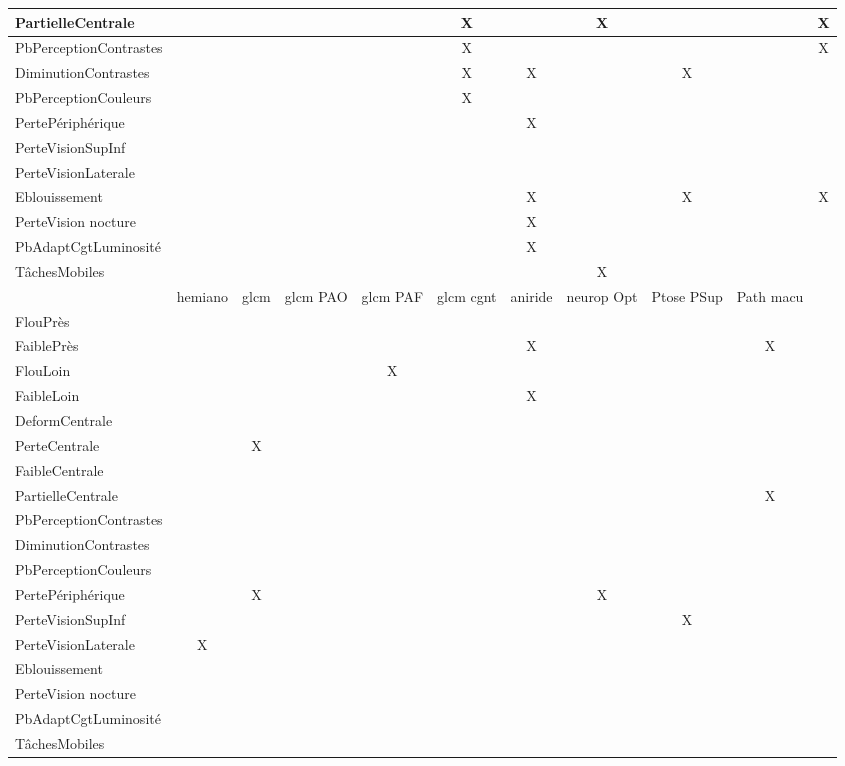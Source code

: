 \documentclass[french,a4paper]{report}
\begin{document}
{\begin{landscape}
\begin{center}
\begin{tabular}{|l|c|c|c|c|c|c|c|c|c|c|}
PartielleCentrale & & & & &X& &X& & &X\\ \hline
PbPerceptionContrastes & & & & &X& & & & &X\\ \hline
DiminutionContrastes & & & & &X&X& &X& & \\ \hline
PbPerceptionCouleurs & & & & &X& & & & & \\ \hline
PertePériphérique & & & & & &X& & & & \\ \hline
PerteVisionSupInf & & & & & & & & & & \\ \hline
PerteVisionLaterale & & & & & & & & & & \\ \hline
Eblouissement & & & & & &X& &X& &X\\ \hline
PerteVision nocture & & & & & &X& & & & \\ \hline
PbAdaptCgtLuminosité & & & & & &X& & & & \\ \hline
TâchesMobiles & & & & & & &X& & & \\ \hline
& hemiano & glcm & glcm PAO & glcm PAF & glcm cgnt & aniride & neurop Opt
& Ptose PSup & Path macu &
\\ \hline
FlouPrès & & & & & & & & & &\\ \hline
FaiblePrès & & & & & &X& & &X&\\ \hline
FlouLoin & & & &X& & & & & &\\ \hline
FaibleLoin & & & & & &X& & & &\\ \hline
DeformCentrale & & & & & & & & & &\\ \hline
PerteCentrale & &X& & & & & & & &\\ \hline
FaibleCentrale & & & & & & & & & &\\ \hline
PartielleCentrale & & & & & & & & &X&\\ \hline
PbPerceptionContrastes & & & & & & & & & &\\ \hline
DiminutionContrastes & & & & & & & & & &\\ \hline
PbPerceptionCouleurs & & & & & & & & & &\\ \hline
PertePériphérique & &X& & & & &X& & &\\ \hline
PerteVisionSupInf & & & & & & & &X& &\\ \hline
PerteVisionLaterale &X& & & & & & & & &\\ \hline
Eblouissement & & & & & & & & & &\\ \hline
PerteVision nocture & & & & & & & & & &\\ \hline
PbAdaptCgtLuminosité & & & & & & & & & &\\ \hline
TâchesMobiles & & & & & & & & & &\\ \hline

\end{tabular}
\end{center}
\end{landscape}}
\end{document}
